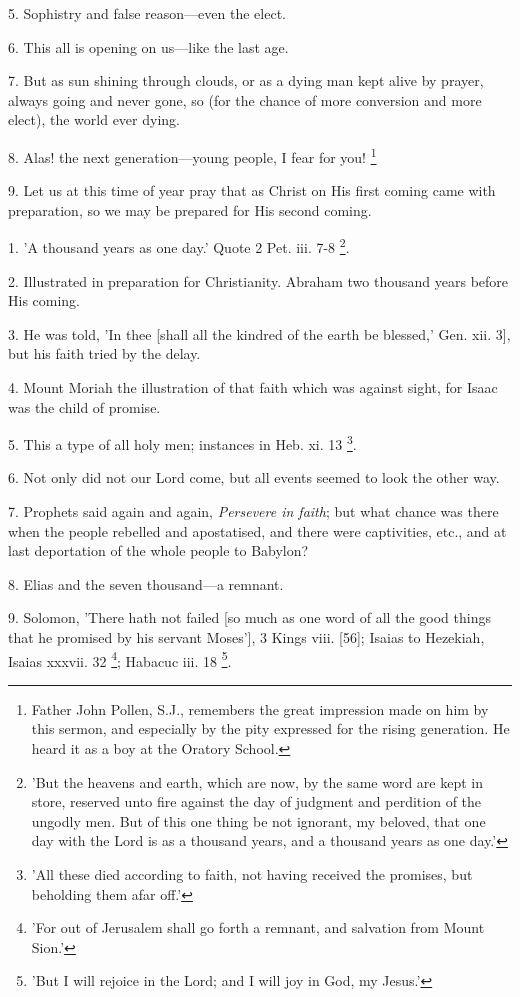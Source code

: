 5. Sophistry and false reason—even the elect.

6. This all is opening on us—like the last age.

7. But as sun shining through clouds, or as a
dying man kept alive by prayer, always going and never gone, so (for
the chance of more conversion and more elect), the world ever dying.

8. Alas! the next generation—young people, I
fear for you! \footnote{Father John Pollen, S.J.,
remembers the great impression made on him by this sermon, and
especially by the pity expressed for the rising generation. He heard
it as a boy at the Oratory School.}

9. Let us at this time of year pray that as
Christ on His first coming came with preparation, so we may be
prepared for His second coming.


1. 'A thousand years as one day.' Quote 2 Pet.
iii. 7-8 \footnote{'But the heavens and
earth, which are now, by the same word are kept in store, reserved
unto fire against the day of judgment and perdition of the ungodly
men. But of this one thing be not ignorant, my beloved, that one day
with the Lord is as a thousand years, and a thousand years as one
day.'}.

2. Illustrated in preparation for Christianity.
Abraham two thousand years before His coming.

3. He was told, 'In thee [shall all the kindred
of the earth be blessed,' Gen. xii. 3], but his faith tried by the
delay.

4. Mount Moriah the illustration of that faith
which was against sight, for Isaac was the child of promise.

5. This a type of all holy men; instances in Heb.
xi. 13 \footnote{'All these died
according to faith, not having received the promises, but beholding
them afar off.'}.

6. Not only did not our Lord come, but all events
seemed to look the other way.

7. Prophets said again and again, \emph{Persevere in
faith}; but what chance was there when the people rebelled and
apostatised, and there were captivities, etc., and at last deportation
of the whole people to Babylon?

8. Elias and the seven thousand—a remnant.

9. Solomon, 'There hath not failed [so much as
one word of all the good things that he promised by his servant
Moses'], 3 Kings viii. [56]; Isaias to Hezekiah, Isaias xxxvii. 32 \footnote{'For out of Jerusalem
shall go forth a remnant, and salvation from Mount Sion.'}; Habacuc iii. 18 \footnote{'But I will rejoice in
the Lord; and I will joy in God, my Jesus.'}.

